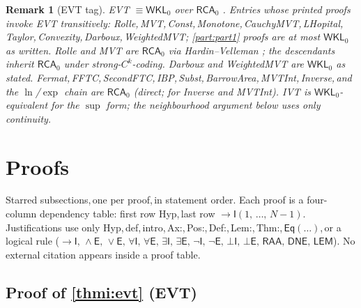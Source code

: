 \documentclass[11pt,reqno]{amsart}
\newcommand{\comma}{,\,\allowbreak}
\theoremstyle{redplain}
\newtheorem{remark}[theorem]{Remark}
\begin{document}
\setcounter{theorem}{1}
\begin{remark}[EVT tag]
	EVT $\equiv\textsf{WKL}_0$ over $\textsf{RCA}_0$ \cite{Simpson2009}. Entries whose printed proofs invoke EVT transitively: Rolle\comma MVT\comma Const\comma Monotone\comma CauchyMVT\comma LHopital\comma Taylor\comma Convexity\comma Darboux\comma WeightedMVT; \autoref{part:part1} proofs are at most $\textsf{WKL}_0$ as written. Rolle and MVT are $\textsf{RCA}_0$ via Hardin--Velleman \cite{HardinVelleman2001}; the descendants inherit $\textsf{RCA}_0$ under strong-$C^k$-coding. Darboux and WeightedMVT are $\textsf{WKL}_0$ as stated. Fermat\comma FFTC\comma SecondFTC\comma IBP\comma Subst\comma BarrowArea\comma MVTInt\comma Inverse\comma and the $\ln$/$\exp$ chain are $\textsf{RCA}_0$ (direct; \cite{HardinVelleman2001,Yokoyama2010} for Inverse and MVTInt). IVT is $\textsf{WKL}_0$-equivalent for the $\sup$ form; the neighbourhood argument below uses only continuity.
\end{remark}

\section{Proofs}
\label{sec:core-proofs}

\noindent Starred subsections\comma one per proof\comma in statement order. Each proof is a four-column dependency table: first row \textsf{Hyp}\comma last row $\to\textsf{I}(1\comma\dots\comma N-1)$. Justifications use only \textsf{Hyp}\comma \textsf{def}\comma \textsf{intro}\comma \textsf{Ax:}\comma \textsf{Pos:}\comma \textsf{Def:}\comma \textsf{Lem:}\comma \textsf{Thm:}\comma $\textsf{Eq}(\dots)$\comma or a logical rule ($\to\textsf{I}\comma\wedge\textsf{E}\comma\vee\textsf{E}\comma\forall\textsf{I}\comma\forall\textsf{E}\comma\exists\textsf{I}\comma\exists\textsf{E}\comma\neg\textsf{I}\comma\neg\textsf{E}\comma\bot\textsf{I}\comma\bot\textsf{E}\comma\textsf{RAA}\comma\textsf{DNE}\comma\textsf{LEM}$). No external citation appears inside a proof table.

\subsection*{Proof of \autoref{thmi:evt} (\textsf{EVT})}
\end{document}
